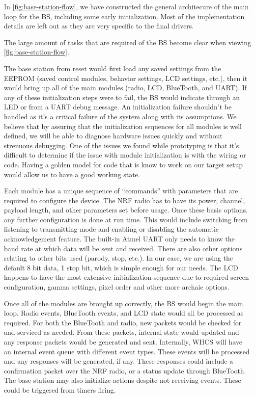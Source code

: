In \autoref{fig:base-station-flow}, we have constructed the general architecure
of the main loop for the BS, including some early initialization. Most of the
implementation details are left out as they are very specific to the final
drivers.


The large amount of tasks that are required of the BS become clear when viewing
\autoref{fig:base-station-flow}.

The base station from reset would first load any saved settings from the
EEPROM (saved control modules, behavior settings, LCD settings, etc.), then it
would bring up all of the main modules (radio, LCD, BlueTooth, and UART). If
any of these initialization steps were to fail, the BS would indicate through
an LED or from a UART debug message. An initialization failure shouldn't be
handled as it's a critical failure of the system along with its assumptions. We
believe that by assuring that the initialization sequences for all modules is
well defined, we will be able to diagnose hardware issues quickly and without
strenuous debugging. One of the issues we found while prototyping is that it's
difficult to determine if the issue with module initialization is with the
wiring or code. Having a golden model for code that is know to work on our
target setup would allow us to have a good working state.

Each module has a unique sequence of ``commands'' with parameters that are
required to configure the device. The NRF radio has to have its power, channel,
payload length, and other parameters set before usage. Once these basic
options, any further configuration is done at run time. This would include
switching from listening to transmitting mode and enabling or disabling the
automatic acknowledgement feature. The built-in Atmel UART only needs to know
the baud rate at which data will be sent and received. There are also other
options relating to other bits used (parody, stop, etc.). In our case, we are
using the default 8 bit data, 1 stop bit, which is simple enough for our needs.
The LCD happens to have the most extensive initialization sequence due to
required screen configuration, gamma settings, pixel order and other more
archaic options.

Once all of the modules are brought up correctly, the BS would begin the main loop.
Radio events, BlueTooth events, and LCD state would all be processed as
required. For both the BlueTooth and radio, new packets would be checked for
and serviced as needed. From these packets, internal state would updated and any
response packets would be generated and sent. Internally, WHCS will have an
internal event queue with different event types. These events will be processed
and any responses will be generated, if any. These responses could include a
confirmation packet over the NRF radio, or a status update through BlueTooth.
The base station may also initialize actions despite not receiving events.
These could be triggered from timers firing.

